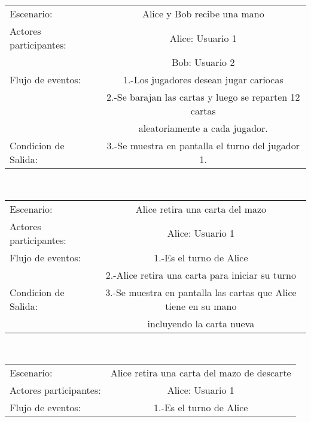 \begin{center}
    \begin{tabular}{ l | c  }
        Escenario:            & Alice y Bob recibe una mano \\
        Actores participantes: & Alice: Usuario  1                                              \\\hline
                                         & Bob: Usuario    2                                                 \\\hline
        Flujo de eventos:                & 1.-Los jugadores desean jugar cariocas                                      \\
                                         & 2.-Se barajan las cartas y luego se reparten 12 cartas\\\hline
                                         & aleatoriamente a cada jugador. \\\hline
        Condicion de Salida:             & 3.-Se muestra en pantalla el turno del jugador 1.                          \\\hline
        \hline
    \end{tabular}
    \\
    \begin{tabular}{ l | c  }
        Escenario:            & Alice retira una carta del mazo \\
        Actores participantes: & Alice: Usuario  1                                              \\\hline
        Flujo de eventos:                & 1.-Es el turno de Alice                                     \\
                                         & 2.-Alice retira una carta para iniciar su turno \\\hline
        Condicion de Salida:             & 3.-Se muestra en pantalla las cartas que Alice tiene en su mano \\\hline
         &incluyendo la carta nueva         \\\hline
        \hline
    \end{tabular}
    \\
    \begin{tabular}{ l | c  }
        Escenario:            & Alice retira una carta del mazo de descarte \\
        Actores participantes: & Alice: Usuario  1                                              \\\hline
        Flujo de eventos:                & 1.-Es el turno de Alice                                 \\

\end{tabular}
\end{center}
